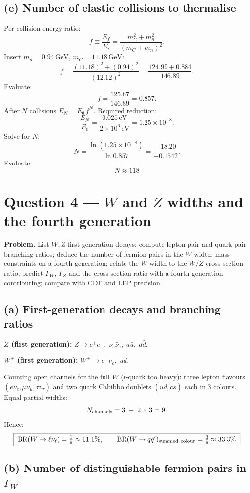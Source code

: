 \documentclass[11pt]{article}
\newcommand{\GeV}{\,\mathrm{GeV}}
\begin{document}
\subsection*{(e) Number of elastic collisions to thermalise}

Per collision energy ratio:
\[
f \equiv \frac{E_f}{E_i} = \frac{m_C^2 + m_n^2}{(m_C+m_n)^2}.
\]
Insert $m_n=0.94\GeV$, $m_C=11.18\GeV$:
\[
f = \frac{(11.18)^2 + (0.94)^2}{(12.12)^2} = \frac{124.99 + 0.884}{146.89}.
\]
Evaluate:
\[
f = \frac{125.87}{146.89} = 0.857.
\]
After $N$ collisions $E_N = E_0\, f^N$. Required reduction:
\[
\frac{E_N}{E_0} = \frac{0.025\,\text{eV}}{2\times 10^6\,\text{eV}} = 1.25\times 10^{-8}.
\]
Solve for $N$:
\[
N = \frac{\ln(1.25\times 10^{-8})}{\ln 0.857} = \frac{-18.20}{-0.1542}.
\]
Evaluate:
\[
\boxed{\;N \approx 118\;}
\]

\section*{Question 4 --- $W$ and $Z$ widths and the fourth generation}

\textbf{Problem.} List $W,Z$ first-generation decays; compute lepton-pair and quark-pair branching ratios; deduce the number of fermion pairs in the $W$ width; mass constraints on a fourth generation; relate the $W$ width to the $W/Z$ cross-section ratio; predict $\Gamma_W$, $\Gamma_Z$ and the cross-section ratio with a fourth generation contributing; compare with CDF and LEP precision.

\subsection*{(a) First-generation decays and branching ratios}

\textbf{$Z$ (first generation):} $Z\to e^+e^-,\;\nu_e\bar\nu_e,\;u\bar u,\;d\bar d$.

\textbf{$W^+$ (first generation):} $W^+\to e^+\nu_e,\;u\bar d$.

Counting open channels for the full $W$ ($t$-quark too heavy): three lepton flavours $(e\nu_e,\mu\nu_\mu,\tau\nu_\tau)$ and two quark Cabibbo doublets $(u\bar d,c\bar s)$ each in 3 colours. Equal partial widths:
\[
N_{\rm channels} = 3 \;+\; 2\times 3 = 9.
\]
Hence:
\[
\boxed{\;\text{BR}(W\to\ell\nu_\ell) = \tfrac{1}{9}\approx 11.1\%,\qquad \text{BR}(W\to q\bar q')_{\rm summed\ colour} = \tfrac{3}{9}\approx 33.3\%\;}
\]

\subsection*{(b) Number of distinguishable fermion pairs in $\Gamma_W$}
\end{document}
